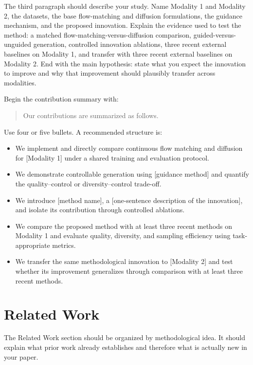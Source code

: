 \documentclass{article}
\begin{document}
The third paragraph should describe your study. Name Modality 1 and Modality 2, the datasets, the base flow-matching and diffusion formulations, the guidance mechanism, and the proposed innovation. Explain the evidence used to test the method: a matched flow-matching-versus-diffusion comparison, guided-versus-unguided generation, controlled innovation ablations, three recent external baselines on Modality 1, and transfer with three recent external baselines on Modality 2. End with the main hypothesis: state what you expect the innovation to improve and why that improvement should plausibly transfer across modalities.

Begin the contribution summary with:

\begin{quote}
Our contributions are summarized as follows.
\end{quote}

Use four or five bullets. A recommended structure is:

\begin{itemize}
    \item We implement and directly compare continuous flow matching and diffusion for [Modality 1] under a shared training and evaluation protocol.
    \item We demonstrate controllable generation using [guidance method] and quantify the quality--control or diversity--control trade-off.
    \item We introduce [method name], a [one-sentence description of the innovation], and isolate its contribution through controlled ablations.
    \item We compare the proposed method with at least three recent methods on Modality 1 and evaluate quality, diversity, and sampling efficiency using task-appropriate metrics.
    \item We transfer the same methodological innovation to [Modality 2] and test whether its improvement generalizes through comparison with at least three recent methods.
\end{itemize}

\section{Related Work}

The Related Work section should be organized by methodological idea. It should explain what prior work already establishes and therefore what is actually new in your paper.
\end{document}
